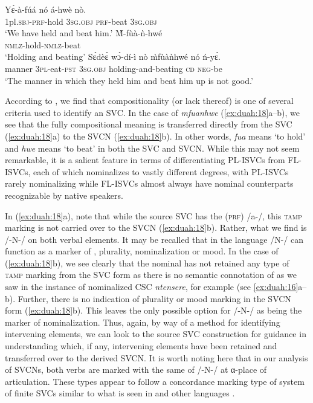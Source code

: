\documentclass[output=paper]{../langsci/langscibook}
\begin{document}
\ea\label{ex:duah:18}
\ea\label{ex:duah:18a}
\gll Yɛ̀-à-fúá nó á-hwè nò.\\
1pl.\textsc{sbj}-\textsc{prf}-hold 3\textsc{sg}.\textsc{obj} \textsc{prf}-beat 3\textsc{sg}.\textsc{obj}\\
\glt `We have held and beat him.'
\ex\label{ex:duah:18b}
\gll M̀-fùà-ǹ-hwé\\
\textsc{nmlz}-hold-\textsc{nmlz}-beat\\
\glt `Holding and beating'
\ex\label{ex:duah:18c}
\gll Sɛ́dèɛ̀ wɔ̀-dí-ì nò m̀fùàǹhwé nó ń-yɛ́.\\
manner 3\textsc{pl}-eat-\textsc{pst}	3\textsc{sg}.\textsc{obj}	holding-and-beating	\textsc{cd} \textsc{neg}-be\\
\glt `The manner in which they held him and beat him up is not good.'
\z
\z

According to \citet{barkema1996}, we find that compositionality (or lack thereof) is one of several criteria used to identify an SVC. In the case of \textit{mfuanhwe} (\ref{ex:duah:18}a--b), we see that the fully compositional meaning is transferred directly from the SVC (\ref{ex:duah:18}a) to the SVCN (\ref{ex:duah:18}b). In other words, \textit{fua} means ‘to hold’ and \textit{hwe} means ‘to beat’ in both the SVC and SVCN. While this may not seem remarkable, it is a salient feature in terms of differentiating PL-ISVCs from FL-ISVCs, each of which nominalizes to vastly different degrees, with PL-ISVCs rarely nominalizing while FL-ISVCs almost always have nominal counterparts recognizable by native speakers.

In (\ref{ex:duah:18}a), note that while the source SVC has the  (\textsc{prf}) /a-/, this \textsc{tamp} marking is not carried over to the SVCN (\ref{ex:duah:18}b). Rather, what we find is /-N-/ on both verbal elements. It may be recalled that in the  language /N-/ can function as a marker of , plurality, nominalization or mood. In the case of (\ref{ex:duah:18}b), we see clearly that the nominal has not retained any type of \textsc{tamp} marking from the SVC form as there is no semantic connotation of  as we saw in the instance of nominalized CSC \textit{ntensere}, for example (see \ref{ex:duah:16}a--b). Further, there is no indication of plurality or mood marking in the SVCN form (\ref{ex:duah:18}b). This leaves the only possible option for /-N-/ as being the marker of nominalization. Thus, again, by way of a method for identifying intervening elements, we can look to the source SVC construction for guidance in understanding which, if any, intervening elements have been retained and transferred over to the derived SVCN. It is worth noting here that in our analysis of SVCNs, both verbs are marked with the same  of /-N-/ at α-place of articulation. These types appear to follow a concordance marking type of system of finite SVCs similar to what is seen in  and other  languages \citep{aikhenvald2006}.\footnotemark 
\end{document}
